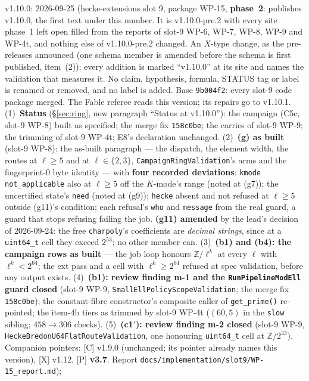 \documentclass[11pt]{article}
\theoremstyle{remark}
\newcommand{\Z}{\mathbb{Z}}
\begin{document}
v1.10.0: 2026-09-25 (hecke-extensions slot 9, package WP-15,
\textbf{phase~2}: publishes v1.10.0, the first text under this number. It is v1.10.0-pre.2 with
every site phase~1 left open filled from the reports of slot-9 WP-6, WP-7, WP-8, WP-9 and WP-4t,
and nothing else of v1.10.0-pre.2 changed. An $X$-type change, as the pre-releases announced
(one schema member is amended before the schema is first published, item~(2)); every addition is
marked ``v1.10.0'' at its site and names the validation that measures it. No claim, hypothesis,
formula, STATUS tag or label is renamed or removed, and no label is added. Base \texttt{9b004f2}:
every slot-9 code package merged. The Fable referee reads this version; its repairs go to v1.10.1.
(1)~\textbf{Status} (\S\ref{sec:ring}, new paragraph ``Status at v1.10.0''): the campaign (C5c,
slot-9 WP-8) built as specified; the merge fix \texttt{158c0be}; the carries of slot-9 WP-9; the
trimming of slot-9 WP-4t; E8's declaration unchanged.
(2)~\textbf{(g) as built} (slot-9 WP-8): the as-built paragraph --- the dispatch, the element
width, the routes at $\ell\ge5$ and at $\ell\in\{2,3\}$, \texttt{CampaignRingValidation}'s arms
and the fingerprint-$0$ byte identity --- with \textbf{four recorded deviations}: \texttt{kmode}
\texttt{not\_applicable} also at $\ell\ge5$ off the $K$-mode's range (noted at (g7)); the
uncertified state's \texttt{need} (noted at (g9)); \texttt{hecke} absent and not refused at
$\ell\ge5$ outside (g11)'s condition; each refusal's \texttt{who} and \texttt{message} from the
real guard, a guard that stops refusing failing the job. \textbf{(g11) amended} by the lead's
decision of 2026-09-24: the free \texttt{charpoly}'s coefficients are \emph{decimal strings},
since at a \texttt{uint64\_t} cell they exceed $2^{53}$; no other member can.
(3)~\textbf{(b1) and (b4): the campaign rows as built} --- the job loop honours $\Z/\ell^k$ at every
$\ell$ with $\ell^k<2^{64}$; the ext pass and a cell with $\ell^k\ge2^{64}$ refused at spec
validation, before any output exists.
(4)~\textbf{(b1): review finding m-1 and the \texttt{RunPipelineModEll} guard closed} (slot-9
WP-9, \texttt{SmallEllPolicyScopeValidation}; the merge fix \texttt{158c0be}); the
constant-fibre constructor's composite caller of \texttt{get\_prime()} re-pointed; the item-4b
tiers as trimmed by slot-9 WP-4t ($(60,5)$ in the \texttt{slow} sibling; $458\to306$ checks).
(5)~\textbf{(c1$'$): review finding m-2 closed} (slot-9 WP-9,
\texttt{HeckeBredonU64FlatRouteValidation}, one honouring \texttt{uint64\_t} cell at $\Z/2^{33}$).
Companion pointers: [C] v1.9.0 (unchanged; its pointer already names this version), [X] v1.12,
[P] \textbf{v3.7}. Report \texttt{docs/implementation/slot9/WP-15\_report.md});
\end{document}
